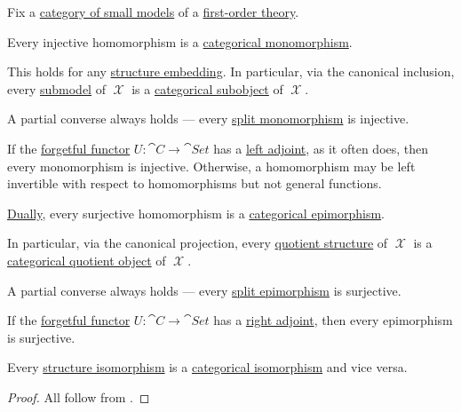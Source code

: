 \begin{proposition}\label{thm:first_order_categorical_invertibility}
  Fix a \hyperref[def:category_of_small_first_order_models]{category of small models} of a \hyperref[def:first_order_theory]{first-order theory}.

  \begin{thmenum}
     Every \hyperref[def:set_valued_map/empty]{} injective homomorphism is a \hyperref[def:morphism_invertibility/left_cancellative]{categorical monomorphism}.

    This holds for any \hyperref[def:first_order_embedding]{structure embedding}. In particular, via the canonical inclusion, every \hyperref[def:first_order_submodel]{submodel} of \( \mscrX \) is a \hyperref[def:subobject_and_quotient]{categorical subobject} of \( \mscrX \).

    A partial converse always holds --- every \hyperref[def:morphism_invertibility/left_cancellative]{split monomorphism} is injective.

    If the \hyperref[def:concrete_category]{forgetful functor} \( U: \cat{C} \to \cat{Set} \) has a \hyperref[def:category_adjunction]{left adjoint}, as it often does, then every monomorphism is injective. Otherwise, a homomorphism may be left invertible with respect to homomorphisms but not general functions.

     \hyperref[thm:categorical_principle_of_duality]{Dually}, every surjective homomorphism is a \hyperref[def:morphism_invertibility/right_cancellative]{categorical epimorphism}.

    In particular, via the canonical projection, every \hyperref[def:first_order_quotient]{quotient structure} of \( \mscrX \) is a \hyperref[def:subobject_and_quotient]{categorical quotient object} of \( \mscrX \).

    A partial converse always holds --- every \hyperref[def:morphism_invertibility/right_cancellative]{split epimorphism} is surjective.

    If the \hyperref[def:concrete_category]{forgetful functor} \( U: \cat{C} \to \cat{Set} \) has a \hyperref[def:category_adjunction]{right adjoint}, then every epimorphism is surjective.

     Every \hyperref[def:first_order_embedding]{structure isomorphism} is a \hyperref[def:morphism_invertibility/isomorphism]{categorical isomorphism} and vice versa.
  \end{thmenum}
\end{proposition}
\begin{proof}
  All follow from .
\end{proof}

